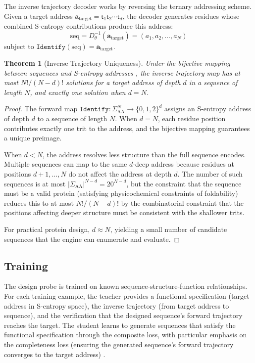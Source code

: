 \documentclass[11pt,twocolumn,a4paper]{article}
\newtheorem{theorem}{Theorem}[section]
\theoremstyle{definition}
\theoremstyle{remark}
\newcommand{\params}{\theta}
\newcommand{\addr}{\mathbf{a}}
\newcommand{\trit}{\mathsf{t}}
\begin{document}
The inverse trajectory decoder works by reversing the ternary addressing scheme. Given a target address $\addr_{\text{target}} = \trit_1 \trit_2 \cdots \trit_d$, the decoder generates residues whose combined S-entropy contributions produce this address:
\begin{equation}
\text{seq} = D^{-1}_\params(\addr_{\text{target}}) = (a_1, a_2, \ldots, a_N)
\end{equation}
subject to $\texttt{Identify}(\text{seq}) = \addr_{\text{target}}$.

\begin{theorem}[Inverse Trajectory Uniqueness]
\label{thm:inverse_uniqueness}
Under the bijective mapping between sequences and S-entropy addresses \citep{sachikonye2025f}, the inverse trajectory map has at most $N!/(N - d)!$ solutions for a target address of depth $d$ in a sequence of length $N$, and exactly one solution when $d = N$.
\end{theorem}

\begin{proof}
The forward map $\texttt{Identify}: \Sigma_{\text{AA}}^N \to \{0,1,2\}^d$ assigns an S-entropy address of depth $d$ to a sequence of length $N$. When $d = N$, each residue position contributes exactly one trit to the address, and the bijective mapping \citep{sachikonye2025f} guarantees a unique preimage.

When $d < N$, the address resolves less structure than the full sequence encodes. Multiple sequences can map to the same $d$-deep address because residues at positions $d+1, \ldots, N$ do not affect the address at depth $d$. The number of such sequences is at most $|\Sigma_{\text{AA}}|^{N-d} = 20^{N-d}$, but the constraint that the sequence must be a valid protein (satisfying physicochemical constraints of foldability) reduces this to at most $N!/(N-d)!$ by the combinatorial constraint that the positions affecting deeper structure must be consistent with the shallower trits.

For practical protein design, $d \approx N$, yielding a small number of candidate sequences that the engine can enumerate and evaluate.
\end{proof}

\subsection{Training}

The design probe is trained on known sequence-structure-function relationships. For each training example, the teacher provides a functional specification (target address in S-entropy space), the inverse trajectory (from target address to sequence), and the verification that the designed sequence's forward trajectory reaches the target. The student learns to generate sequences that satisfy the functional specification through the composite loss, with particular emphasis on the completeness loss (ensuring the generated sequence's forward trajectory converges to the target address) \citep{huang2016}.
\end{document}
